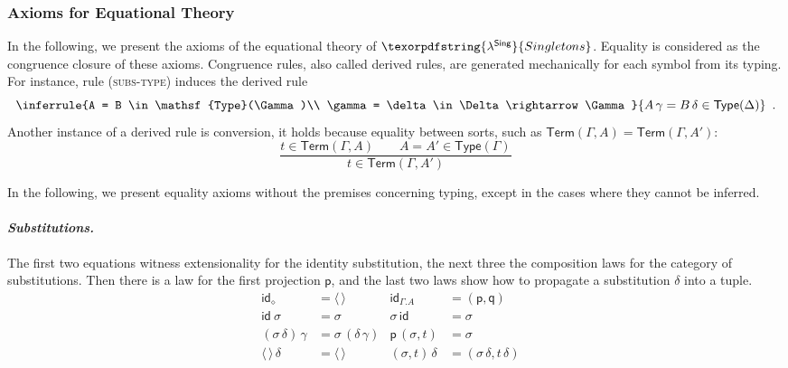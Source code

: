 \documentclass{LMCS}
\theoremstyle{plain}\newtheorem{satz}[thm]{Satz}
\newcommand{\LONGVERSION}[1]{#1}
\newcommand{\SHORTVERSION}[1]{}
\newcommand{\ru}{\dfrac}
\newcommand{\lambdaSing}{\texorpdfstring{\ensuremath{\lambda^{\mathsf{Sing}}}}{Singletons}}
\newcommand{\type}[1]{\mathsf{Type}(#1)}
\newcommand{\term}[2]{\mathsf{Term}(#1,#2)}
\newcommand{\into}{\rightarrow}
\newcommand{\ectx}{\diamond}
\newcommand{\ctxe}[2]{#1.#2}
\newcommand{\idsubs}[1]{\mathsf{id}_{#1}}
\newcommand{\esubs}{\langle\,\!\rangle}
\newcommand{\exsubs}[2]{( #1, #2)}
\newcommand{\subsc}[2]{#1\,#2}
\newcommand{\subsTm}[2]{#1\,#2}
\newcommand{\subsTy}[2]{#1\,#2}
\newcommand{\p}{\mathsf{p}}
\newcommand{\q}{\mathsf{q}}
\newcommand{\LONGVERSION}[1]{}
\newcommand{\SHORTVERSION}[1]{#1}
\newcommand{\LONGSHORT}[2]{\LONGVERSION{#1}\SHORTVERSION{#2}}
\newcommand{\para}[1]{
\LONGSHORT{\paragraph{\it #1.}}
          {\vspace{1ex}\noindent{\it #1.}}
}
\begin{document}
\subsubsection{Axioms for Equational Theory}
\label{sec:ax}

In the following, we present the axioms of the equational theory of
$\lambdaSing$.  Equality is considered as the congruence closure of
these axioms.  Congruence rules, also called derived rules, are
generated mechanically for each symbol from its typing.  For instance,
rule (\textsc{subs-type}) induces the derived rule
\begin{equation*}
   \inferrule{A = B \in \type{\Gamma}\\ \gamma = \delta \in
  \Delta\into\Gamma}{\subsTy{A}{\gamma} = \subsTy{B}{\delta}\in
  \type{\Delta}}\label{eq:example} \enspace .
\end{equation*}
Another instance of a derived rule is conversion, it holds because
equality between sorts, such as $\term \Gamma A = \term \Gamma {A'}$:
\[
  \ru{t \in \term \Gamma A \qquad
      A = A' \in \type \Gamma
    }{t \in \term \Gamma {A'}}
\]\medskip

\noindent  In the following, we present equality axioms 
without the premises concerning typing, 
except in the cases where they cannot be inferred.


\para{Substitutions}  The first two equations witness extensionality
for the identity substitution, the next three the composition laws for
the category of substitutions.  Then there is a law for the first
projection $\p$, and the last two laws show how to propagate a substitution
$\delta$ into a tuple.
\label{sec:ax-subs}
\begin{align*}
  \idsubs{\ectx} &= \esubs& 
  \idsubs{\ctxe{\Gamma}{A}} & =  \exsubs{\p}{\q}& 
\\
  \subsc{\idsubs{}}{\sigma} &=  \sigma & 
  \subsc{\sigma}{\idsubs{}} &=  \sigma & 
\\
  \subsc{(\subsc{\sigma}{\delta})}{\gamma} &=  \subsc{\sigma}{(\subsc{\delta}{\gamma})} & 
  \subsc{\p}{\exsubs{\sigma}{t}} & =  \sigma & 
\\
  \subsc{\esubs}{\delta} &=  \esubs& 
  \subsc{\exsubs{\sigma}{t}}{\delta} &=
    \exsubs{\subsc{\sigma}{\delta}}{\subsTm{t}{\delta}}&
\end{align*}
\end{document}
